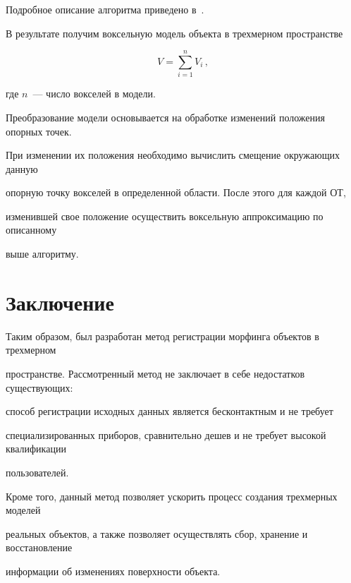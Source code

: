 Подробное описание алгоритма приведено в~\cite{9-7}.





В результате получим воксельную модель объекта в трехмерном пространстве


$$


V=\sum\limits_{i=1}^n V_i\,,


$$


где $n$~--- число вокселей в модели.





Преобразование модели основывается на обработке изменений положения опорных точек. 


При изменении их положения необходимо вычислить смещение окружающих данную 


опорную точку вокселей в определенной области. После этого для каж\-дой ОТ, 


изменившей свое положение осуществить воксельную аппроксимацию по описанному 


выше алгоритму.





\section{Заключение}





Таким образом, был разработан метод регистрации мор\-фин\-га объектов в трехмерном 


пространстве. Рассмотренный метод не заключает в себе недостатков существующих: 


способ регистрации исходных данных является бесконтактным и не требует 


специализированных приборов, сравнительно дешев и не требует высокой квалификации 


пользователей.





Кроме того, данный метод позволяет ускорить процесс создания трехмерных моделей 


реальных объектов, а также позволяет осуществлять сбор, хранение и восстановление 


информации об изменениях поверхности объекта.





